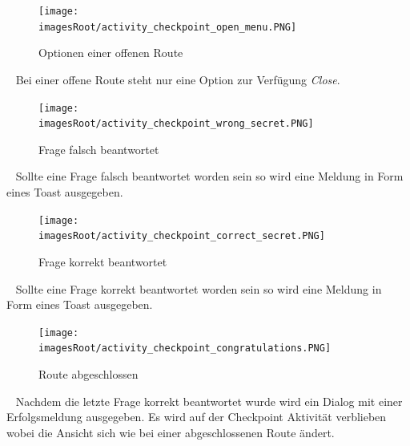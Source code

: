 \documentclass[11pt, a4paper, twoside]{article}   	%
\newcommand{\imagesRoot}{images}
\begin{document}
\begin{figure}[h]
	\centering
	\texttt{[image: \\imagesRoot/activity\_checkpoint\_open\_menu.PNG]}
	\caption
	{Optionen einer offenen Route}
\end{figure}
\ \newline
Bei einer offene Route steht nur eine Option zur Verfügung \emph{Close}.
\newpage
\begin{figure}[h]
	\centering
	\texttt{[image: \\imagesRoot/activity\_checkpoint\_wrong\_secret.PNG]}
	\caption
	{Frage falsch beantwortet}
\end{figure}
\ \newline
Sollte eine Frage falsch beantwortet worden sein so wird eine Meldung in Form eines Toast ausgegeben.
\ \newline
\begin{figure}[h]
	\centering
	\texttt{[image: \\imagesRoot/activity\_checkpoint\_correct\_secret.PNG]}
	\caption
	{Frage korrekt beantwortet}
\end{figure}
\ \newline
Sollte eine Frage korrekt beantwortet worden sein so wird eine Meldung in Form eines Toast ausgegeben.
\ \newline
\newpage
\begin{figure}[h]
	\centering
	\texttt{[image: \\imagesRoot/activity\_checkpoint\_congratulations.PNG]}
	\caption
	{Route abgeschlossen}
\end{figure}
\ \newline
Nachdem die letzte Frage korrekt beantwortet wurde  wird ein Dialog mit einer Erfolgsmeldung ausgegeben. Es wird auf der Checkpoint Aktivität verblieben wobei die Ansicht sich wie bei einer abgeschlossenen Route ändert.
\end{document}
